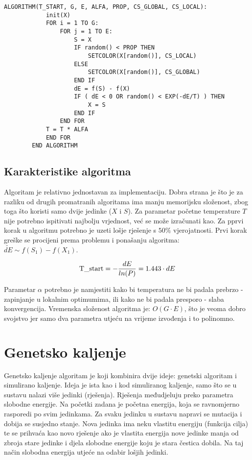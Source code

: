 \documentclass[times, utf8, diplomski, numeric]{fer}
\begin{document}
\begin{singlespace}
	\begin{lstlisting}[caption=Pseudok\^{o}d simuliranog kaljenja]
		ALGORITHM(T_START, G, E, ALFA, PROP, CS_GLOBAL, CS_LOCAL):
			init(X)
			FOR i = 1 TO G:
				FOR j = 1 TO E:
					S = X
					IF random() < PROP THEN
						SETCOLOR(X[random()], CS_LOCAL)
					ELSE
						SETCOLOR(X[random()], CS_GLOBAL)
					END IF
					dE = f(S) - f(X)
					IF ( dE < 0 OR random() < EXP(-dE/T) ) THEN
						X = S
					END IF
				END FOR
			T = T * ALFA
			END FOR
		END ALGORITHM
	\end{lstlisting}
\end{singlespace}

\subsection{Karakteristike algoritma}

Algoritam je relativno jednostavan za implementaciju. Dobra strana je što je za razliku od drugih promatranih algoritama ima manju memorijsku složenost, zbog toga što koristi samo dvije jedinke ($X$ i $S$). Za parametar početne temperature $T$ nije potrebno ispitivati najbolju vrjednost, već se može izračunati kao. Za pprvi korak u algoritmu potrebno je uzeti lošje rješenje s $50\%$ vjerojatnosti. Prvi korak greške se procijeni prema problemu i ponašanju algoritma: $\tilde{dE}\sim f(S_1)-f(X_1)$.  

\begin{equation}
\textup{T\_start} = -\frac{dE}{ln(P)} = 1.443 \cdot dE
\end{equation}  

Parametar $\alpha$ potrebno je namjestiti kako bi temperatura ne bi padala prebrzo - zapinjanje u lokalnim optimumima, ili kako ne bi padala presporo - slaba konvergencija. Vremenska složenost algoritma je: $O(G\cdot E)$, što je veoma dobro svojstvo jer samo dva parametra utjeću na vrijeme izvođenja i to polinomno. 

\section{Genetsko kaljenje}

Genetsko kaljenje \cite{lit18} algoritam je koji kombinira dvije ideje: genetski algoritam i simulirano kaljenje. Ideja je ista kao i kod simuliranog kaljenje, samo što se u sustavu nalazi više jedinki (rješenja). Rješenja međudjeluju preko parametra slobodne energije. Na početki zadana je početna energija, koja se ravnomjerno rasporedi po svim jedinkama. Za svaku jedinku u sustavu napravi se mutacija i dobija se susjedno stanje. Nova jedinka ima neku vlastitu energiju (funkcija cilja) te se prihvaća kao novo rješenje ako je vlastita energija nove jedinke manja od zbroja stare jedinke i djela slobodne energije koju je stara čestica dobila. Na taj način slobodna energija utjeće na odabir lošjih jedinki.
\end{document}

